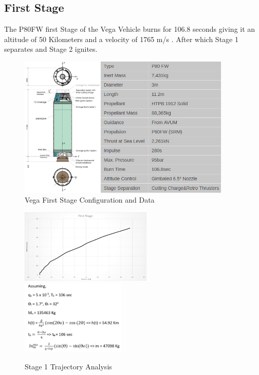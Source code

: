 \documentclass[11pt,fleqn]{book} %
\begin{document}
\subsection{First Stage}
The P80FW first Stage of the Vega Vehicle burns for 106.8 seconds giving it an altitude of 50 Kilometers and a velocity of 1765 m/s . After which Stage 1 separates and Stage 2 ignites. 
\begin{figure}[h]
    \centering
    \includegraphics[width=0.9\textwidth]{Stage1.png}
    \caption{Vega First Stage Configuration and Data}
    \label{fig:super}
\end{figure}

\begin{figure}[h]
    \includegraphics[width=0.56\textwidth]{Stage_1_Plot.jpg}
    \includegraphics[width=0.44\textwidth]{Stage1_Cal.png}
    \caption{Stage 1 Trajectory Analysis}
    \label{fig:super}
\end{figure}
\end{document}

